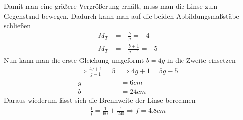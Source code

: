 \documentclass[12pt,a4paper,ngerman]{article}
\begin{document}
Damit man eine größere Vergrößerung erhält, muss man die Linse zum Gegenstand bewegen. Dadurch kann man auf die beiden Abbildungsmaßstäbe schließen
\begin{align*}
M_T &=-\frac{b}{g} = -4 \\
M_T &= -\frac{b+1}{g-1} = -5
\end{align*}
Nun kann man die erste Gleichung umgeformt $b = 4g$ in die Zweite einsetzen
\begin{align*}
\Rightarrow \frac{4g + 1}{g -1} = 5 &\Rightarrow 4g + 1 = 5g - 5 \\
g &= 6cm \\
b &= 24cm
\end{align*}
Daraus wiederum lässt sich die Brennweite der Linse berechnen
\begin{align*}
\frac{1}{f} = \frac{1}{60} + \frac{1}{240} \Rightarrow f = 4.8cm
\end{align*}

\pagebreak
\end{document}
